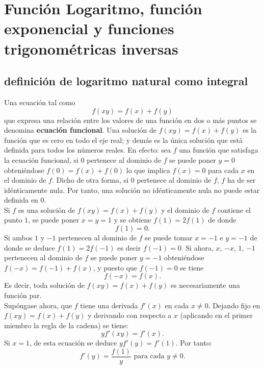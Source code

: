 \chapter{Función Logaritmo, función exponencial y funciones trigonométricas inversas}

\setcounter{section}{1}
\section{definición de logaritmo natural como integral}

Una ecuación tal como 
$$f(xy)=f(x)+f(y)$$ 
que expresa una relación entre los valores de una función en dos o más puntos se denomina \textbf{ecuación funcional}. Una solución de $f(xy)=f(x)+f(y)$ es la función que es cero en todo el eje real; y demás es la única solución que está definida para todos los números reales. En efecto: sea $f$ una función que satisfaga la ecuación funcional, si $0$ pertenece al dominio de $f$ se puede poner $y=0$ obteniéndose $f(0)=f(x)+f(0)$ lo que implica $f(x)=0$ para cada $x$ en el dominio de $f$. Dicho de otra forma, si $0$ pertenece al dominio de $f$, $f$ ha de ser idénticamente nula. Por tanto, una solución no idénticamente nula no puede estar definida en $0$.\\

Si $f$ es una solución de $f(xy)=f(x)+f(y)$ y el dominio de $f$ contiene el punto $1$, se puede poner $x=y=1$ y se obtiene $f(1)=2f(1)$ de donde
$$f(1)=0.$$
Si ambos $1$ y $-1$ pertenecen al dominio de $f$ se puede tomar $x=-1$ e $y=-1$ de donde se deduce $f(1)=2f(-1)$ es decir $f(-1)=0$. Si ahora, $x$, $-x$, $1$, $-1$ pertenecen al dominio de $f$ se puede poner $y=-1$ obteniéndose $f(-x)=f(-1)+f(x)$, y puesto que $f(-1)=0$ se tiene
$$f(-x)=f(x).$$
Es decir, toda solución de $f(xy)=f(x)+f(y)$ es necesariamente una función par.\\

Supóngase ahora, que $f$ tiene una derivada $f'(x)$ en cada $x\neq 0$. Dejando fijo en $f(xy)=f(x)+f(y)$ y derivando con respecto a $x$ (aplicando en el primer miembro la regla de la cadena) se tiene:
$$yf'(xy)=f'(x).$$
Si $x=1$, de esta ecuación se deduce $yf'(y)=f'(1)$. Por tanto:
$$f'(y)=\dfrac{f(1)}{y}\mbox{ para cada }y\neq 0.$$

